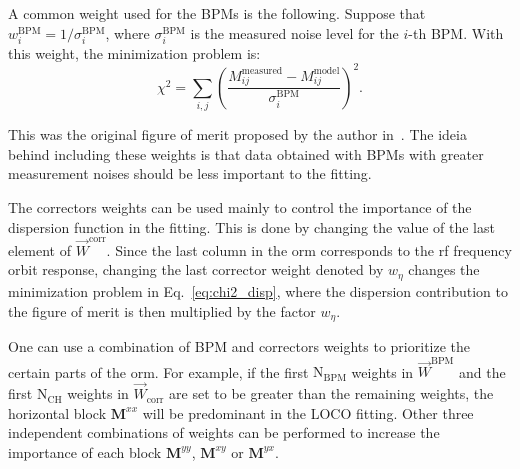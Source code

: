 A common weight used for the BPMs is the following. Suppose that $w^{\mathrm{BPM}}_{i} = 1/\sigma^{\mathrm{BPM}}_{i}$, where $\sigma^{\mathrm{BPM}}_{i}$ is the measured noise level for the $i$-th BPM. With this weight, the minimization problem is:
\begin{equation}
    \chi^2 = \sum_{i, j} \left(\dfrac{M^{\mathrm{measured}}_{ij} - M^{\mathrm{model}}_{ij}}{\sigma^{\mathrm{BPM}}_{i}}\right)^2.
    \label{eq:chi2_original}
\end{equation}

This was the original figure of merit proposed by the author in~\cite{safranek1997}. The ideia behind including these weights is that data obtained with BPMs with greater measurement noises should be less important to the fitting.

The correctors weights can be used mainly to control the importance of the dispersion function in the fitting. This is done by changing the value of the last element of $\vec{W}^{\mathrm{corr}}$. Since the last column in the \gls{orm} corresponds to the \gls{rf} frequency orbit response, changing the last corrector weight denoted by $w_{\eta}$ changes the minimization problem in Eq.~\eqref{eq:chi2_disp}, where the dispersion contribution to the figure of merit is then multiplied by the factor $w_{\eta}$.

One can use a combination of BPM and correctors weights to prioritize the certain parts of the \gls{orm}. For example, if the first $\mathrm{N}_{\mathrm{BPM}}$ weights in $\vec{W}^{\mathrm{BPM}}$ and the first $\mathrm{N}_{\mathrm{CH}}$ weights in $\vec{W}_{\mathrm{corr}}$ are set to be greater than the remaining weights, the horizontal block $\mathbf{M}^{xx}$ will be predominant in the LOCO fitting. Other three independent combinations of weights can be performed to increase the importance of each block $\mathbf{M}^{yy}$, $\mathbf{M}^{xy}$ or $\mathbf{M}^{yx}$.


